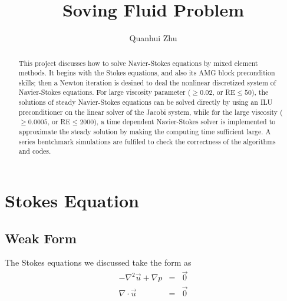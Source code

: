 \documentclass[a4paper]{article}
\title{Soving Fluid Problem}
\author{Quanhui Zhu}
\begin{document}
\maketitle

\begin{abstract}
This project discusses how to solve Navier-Stokes equations by mixed element methods. It begins with the Stokes equations, and also its AMG block precondition skills; then a Newton iteration is desined to deal the nonlinear discretized system of Navier-Stokes equations. For large viscosity parameter ($\geq 0.02$, or RE$\leq 50$), the solutions of steady Navier-Stokes equations can be solved directly by using an ILU preconditioner on the linear solver of the Jacobi system, while for the large viscosity ($\geq 0.0005$, or RE$\leq 2000$), a time dependent Navier-Stokes solver is implemented to approximate the steady solution by making the computing time sufficient large. A series bentchmark simulations are fulfiled to check the correctness of the algorithms and codes. 
\end{abstract}


\section{Stokes Equation}

\subsection{Weak Form}

The Stokes equations we discussed take the form as
\begin{equation}
\begin{array}{rcl}
-\nabla^2 \vec{u} + \nabla p &=& \vec{0} \\
\nabla \cdot \vec{u} &=& \vec{0}
\label{eq::Stokes-problem}
\end{array}
\end{equation}
\end{document}
